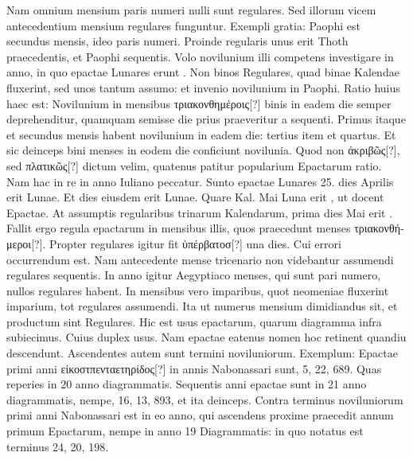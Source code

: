 Nam omnium
mensium paris numeri nulli sunt regulares.
Sed illorum vicem
antecedentium mensium regulares funguntur.
Exempli gratia: Paophi
est secundus mensis, ideo paris numeri.
Proinde regularis unus
erit Thoth praecedentis, et Paophi sequentis.
Volo novilunium illi
competens investigare in anno, in quo epactae Lunares erunt .
Non
binos Regulares, quad binae Kalendae fluxerint, sed unos tantum
assumo: et invenio novilunium in  Paophi.
Ratio huius haec
est: Novilunium in mensibus \textgreek{τριακονθημέροις}[?]
 binis in eadem die semper
deprehenditur, quamquam semisse die prius praeveritur a sequenti.
Primus itaque et secundus mensis habent novilunium in eadem
die: tertius item et quartus.
Et sic deinceps bini menses in
eodem die conficiunt novilunia.
Quod non \textgreek{ἀκριβῶς}[?], sed \textgreek{πλατικῶς}[?]
dictum velim, quatenus patitur popularium Epactarum ratio.
Nam
hac in re in anno Iuliano peccatur.
Sunto epactae Lunares 25.
dies
Aprilis erit  Lunae.
Et dies eiusdem erit  Lunae.
Quare Kal. Mai Luna erit , ut docent Epactae.
At assumptis
regularibus trinarum Kalendarum, prima dies Mai erit .
Fallit
ergo regula epactarum in mensibus illis, quos praecedunt menses
\textgreek{τριακονθήμεροι}[?].
Propter regulares igitur fit \textgreek{ὑπέρβατοσ}[?] una dies.
Cui
errori occurrendum est.
Nam antecedente mense tricenario non videbantur
assumendi regulares sequentis.
In anno igitur Aegyptiaco
menses, qui sunt pari numero, nullos regulares habent.
In mensibus
vero imparibus, quot neomeniae fluxerint imparium, tot regulares
assumendi.
Ita ut numerus mensium dimidiandus sit, et productum
sint Regulares.
Hic est usus epactarum, quarum diagramma
infra subiecimus.
Cuius duplex usus.
Nam epactae eatenus nomen
hoc retinent quandiu descendunt.
Ascendentes autem sunt termini
noviluniorum.
Exemplum: Epactae primi anni \textgreek{εἰκοστπενταετηρίδος}[?] in annis
Nabonassari sunt, 5, 22, 689.
Quas reperies in 20 anno diagrammatis.
Sequentis anni epactae sunt in 21 anno diagrammatis, nempe,
16, 13, 893, et ita deinceps.
Contra terminus noviluniorum primi anni
Nabonassari est in eo anno, qui ascendens proxime praecedit annum
primum Epactarum, nempe in anno 19 Diagrammatis: in
quo notatus est terminus 24, 20, 198.
